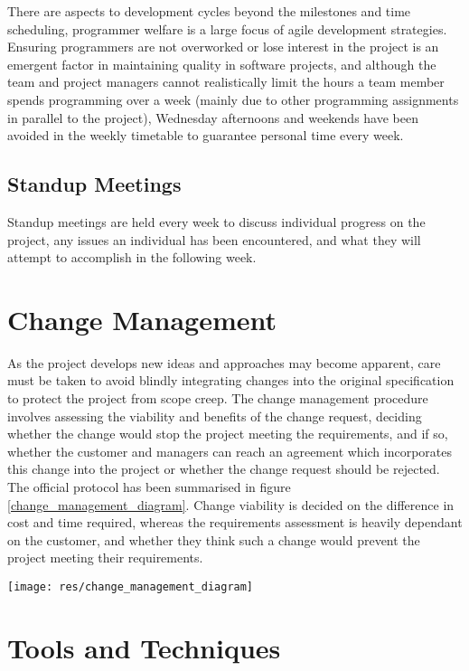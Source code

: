 \begin{fullwidth}
\begin{fullwidth}
There are aspects to development cycles beyond the milestones and time scheduling, programmer welfare is a large focus of agile development strategies. Ensuring programmers are not overworked or lose interest in the project is an emergent factor in maintaining quality in software projects, and although the team and project managers cannot realistically limit the hours a team member spends programming over a week (mainly due to other programming assignments in parallel to the project), Wednesday afternoons and weekends have been avoided in the weekly timetable to guarantee personal time every week.

\subsection{Standup Meetings}
Standup meetings are held every week to discuss individual progress on the project, any issues an individual has been encountered, and what they will attempt to accomplish in the following week.

\section{Change Management}
As the project develops new ideas and approaches may become apparent, care must be taken to avoid blindly integrating changes into the original specification to protect the project from scope creep. The change management procedure involves assessing the viability and benefits of the change request, deciding whether the change would stop the project meeting the requirements, and if so, whether the customer and managers can reach an agreement which incorporates this change into the project or whether the change request should be rejected. The official protocol has been summarised in figure \ref{change_management_diagram}. Change viability is decided on the difference in cost and time required, whereas the requirements assessment is heavily dependant on the customer, and whether they think such a change would prevent the project meeting their requirements.

\end{fullwidth}
\clearpage

\begin{figure*}[h!]
	\label{change_management_diagram}
	\texttt{[image: res/change\_management\_diagram]}
	\caption{Change management workflow}
\end{figure*}

\section{Tools and Techniques}


\end{fullwidth}
